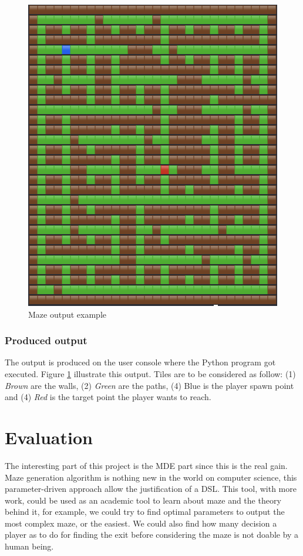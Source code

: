 \documentclass[review]{elsarticle}
\begin{document}
\begin{figure}
	\includegraphics[width=\linewidth]{pretty_output.png}
	\caption{Maze output example}
	\label{fig:pretty_output}
\end{figure}

\subsubsection{Produced output}
The output is produced on the user console where the Python program got executed. Figure \ref{fig:pretty_output} illustrate this output. Tiles are to be considered as follow: (1) \textit{Brown} are the walls, (2) \textit{Green} are the paths, (4) Blue is the player spawn point and (4) \textit{Red} is the target point the player wants to reach.

\section{Evaluation}
The interesting part of this project is the MDE part since this is the real gain. Maze generation algorithm is nothing new in the world on computer science, this parameter-driven approach allow the justification of a DSL. This tool, with more work, could be used as an academic tool to learn about maze and the theory behind it, for example, we could try to find optimal parameters to output the most complex maze, or the easiest. We could also find how many decision a player as to do for finding the exit before considering the maze is not doable by a human being.
\end{document}
